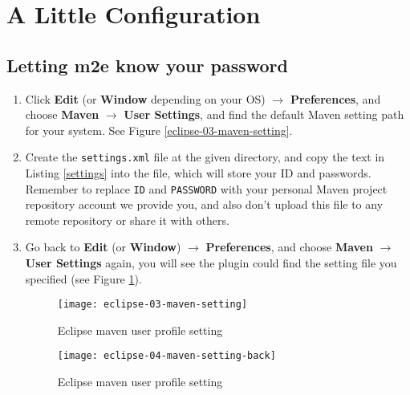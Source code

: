 
\section{A Little Configuration}

\subsection{Letting m2e know your password}

\begin{enumerate}
\item Click \textbf{Edit} (or \textbf{Window} depending on your OS) $\rightarrow$ \textbf{Preferences}, and choose \textbf{Maven} $\rightarrow$ \textbf{User Settings}, and find the default Maven setting path for your system. See Figure \ref{eclipse-03-maven-setting}.

\item Create the \verb|settings.xml| file at the given directory, and copy the text in Listing \ref{settings} into the file, which will store your ID and passwords. Remember to replace \verb|ID| and \verb|PASSWORD| with your personal Maven project repository account we provide you, and also don't upload this file to any remote repository or share it with others.

\item Go back to \textbf{Edit} (or \textbf{Window}) $\rightarrow$ \textbf{Preferences}, and choose \textbf{Maven} $\rightarrow$ \textbf{User Settings} again, you will see the plugin could find the setting file you specified (see Figure \ref{eclipse-04-maven-setting-back}).

\begin{figure}[t]
\hspace{-3em}
\begin{minipage}{0.5\textwidth}
\centering
\texttt{[image: eclipse-03-maven-setting]}
\caption{Eclipse maven user profile setting\label{eclipse-03-maven-setting}}
\end{minipage}
\hfill
\begin{minipage}{0.5\textwidth}
\centering
\texttt{[image: eclipse-04-maven-setting-back]}
\caption{Eclipse maven user profile setting\label{eclipse-04-maven-setting-back}}
\end{minipage}
\hspace{-3em}
\end{figure}



\end{enumerate}

